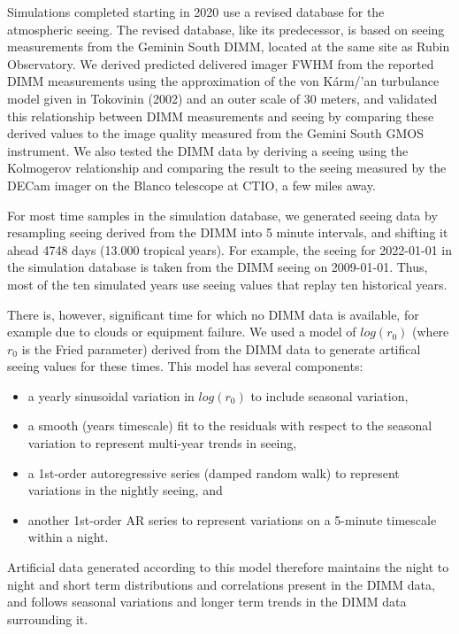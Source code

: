 
Simulations completed starting in 2020 use a revised database for the
atmospheric seeing. The revised database, like its predecessor, is
based on seeing measurements from the Geminin South DIMM, located at
the same site as Rubin Observatory. We derived predicted delivered
imager FWHM from the reported DIMM measurements using the
approximation of the von K\'arm/'an turbulance model given in
Tokovinin (2002) and an outer scale of 30 meters, and validated this
relationship between DIMM measurements and seeing by comparing these
derived values to the image quality measured from the Gemini South
GMOS instrument. We also tested the DIMM data by deriving a seeing
using the Kolmogerov relationship and comparing the result to the
seeing measured by the DECam imager on the Blanco telescope at CTIO, a
few miles away.

For most time samples in the simulation database, we generated seeing
data by resampling seeing derived from the DIMM into 5 minute
intervals, and shifting it ahead 4748 days (13.000 tropical years). For
example, the seeing for 2022-01-01 in the simulation database is taken
from the DIMM seeing on 2009-01-01. Thus, most of the ten simulated
years use seeing values that replay ten historical years.

There is, however, significant time for which no DIMM data is available, for
example due to clouds or equipment failure. We used a model of
$log(r_{0})$ (where $r_{0}$ is the Fried parameter) derived
from the DIMM data to generate artifical seeing values for these
times. This model has several components:
\begin{itemize}
  \item a yearly sinusoidal variation in $log(r_{0})$ to include
    seasonal variation,
  \item a smooth (years timescale) fit to the residuals with respect
    to the seasonal variation to represent multi-year trends in
    seeing,
  \item a 1st-order autoregressive series (damped random walk) to
    represent variations in the nightly seeing, and
  \item another 1st-order AR series to represent variations on a
    5-minute timescale within a night.
\end{itemize}
Artificial data generated according to this model therefore maintains
the night to night and short term distributions and correlations
present in the DIMM data, and follows seasonal variations and longer
term trends in the DIMM data surrounding it. 

